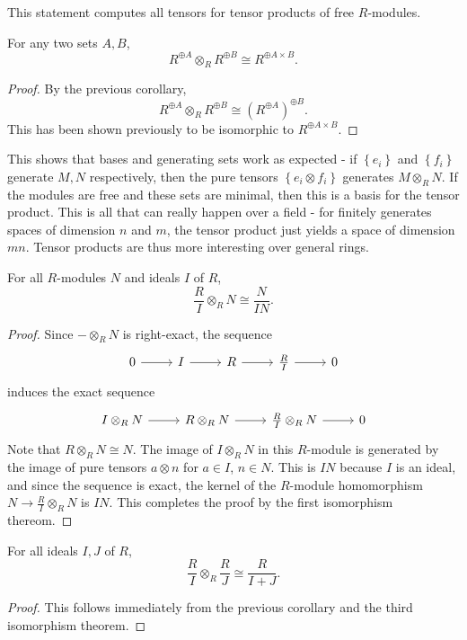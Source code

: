 This statement computes all tensors for tensor products of free $R$-modules.
\begin{corollary}\label{cor:8.3}
	For any two sets $A,B$,
	\[
		R^{\oplus A} \otimes_R R^{\oplus B} \cong R^{\oplus A\times B} 
	.\]
\end{corollary}
\begin{proof}
	By the previous corollary,
	\[
		R^{\oplus A} \otimes_R R^{\oplus B} \cong \left( R^{\oplus A}  \right) ^{\oplus B}
	.\]
	This has been shown previously to be isomorphic to $R^{\oplus A\times B} $.
\end{proof}
This shows that bases and generating sets work as expected - if $\left\{ e_i \right\}$ and $\left\{ f_i \right\} $ generate $M,N$ respectively, then the pure tensors $\left\{ e_i \otimes f_i \right\} $ generates $M\otimes_R N$. If the modules are free and these sets are minimal, then this is a basis for the tensor product. This is all that can really happen over a field - for finitely generates spaces of dimension $n$ and $m$, the tensor product just yields a space of dimension $mn$. Tensor products are thus more interesting over general rings.
\begin{corollary}\label{cor:8.4}
	For all $R$-modules $N$ and ideals $I$ of $R$,
	\[
		\frac{R}{I} \otimes_R N \cong \frac{N}{IN} 
	.\]
\end{corollary}
\begin{proof}
	Since $-\otimes_R N$ is right-exact, the sequence
	\[\begin{tikzcd}[row sep = 2.5em, column sep = 2.5em]
		0\arrow[r]&I\arrow[r]&R\arrow[r]&\frac{R}{I} \arrow[r]&0
	\end{tikzcd}\]
	induces the exact sequence
	\[\begin{tikzcd}[row sep = 2.5em, column sep = 2.5em]
		I\otimes_R N\arrow[r]&R\otimes_R N\arrow[r]&\frac{R}{I} \otimes_R N\arrow[r]&0
	\end{tikzcd}\]
	Note that $R\otimes _R N\cong N$. The image of $I\otimes_R N$ in this $R$-module is generated by the image of pure tensors $a\otimes n$ for $a\in I$, $n\in N$. This is $IN$ because $I$ is an ideal, and since the sequence is exact, the kernel of the $R$-module homomorphism $N\to \frac{R}{I} \otimes_R N$ is $IN$. This completes the proof by the first isomorphism thereom.
\end{proof}
\begin{corollary}\label{cor:8.5}
	For all ideals $I,J$ of $R$,
	\[
		\frac{R}{I} \otimes_R \frac{R}{J} \cong \frac{R}{I+J} 
	.\]
	
\end{corollary}
\begin{proof}
	This follows immediately from the previous corollary and the third isomorphism theorem.
\end{proof}

